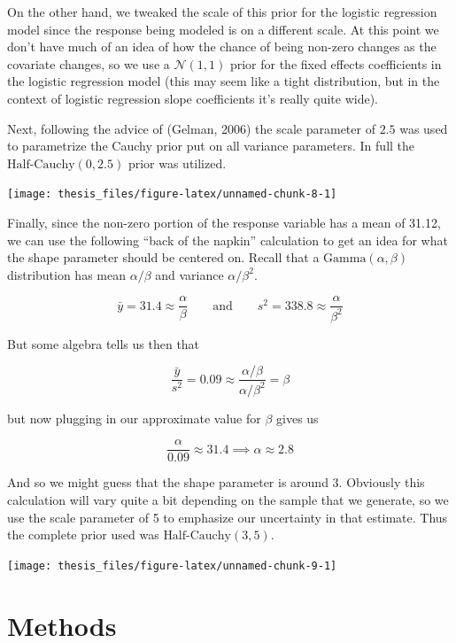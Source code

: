 \documentclass[12pt,twoside]{reedthesis}
\begin{document}
On the other hand, we tweaked the scale of this prior for the logistic regression model since the response being modeled is on a different scale. At this point we don't have much of an idea of how the chance of being non-zero changes as the covariate changes, so we use a \(\mathcal{N}(1,1)\) prior for the fixed effects coefficients in the logistic regression model (this may seem like a tight distribution, but in the context of logistic regression slope coefficients it's really quite wide).

Next, following the advice of (Gelman, 2006) the scale parameter of \(2.5\) was used to parametrize the Cauchy prior put on all variance parameters. In full the \(\text{Half-Cauchy}(0, 2.5)\) prior was utilized.
\begin{center}\texttt{[image: thesis\_files/figure-latex/unnamed-chunk-8-1]} \end{center}

Finally, since the non-zero portion of the response variable has a mean of 31.12, we can use the following ``back of the napkin'' calculation to get an idea for what the shape parameter should be centered on. Recall that a \(\text{Gamma}(\alpha, \beta)\) distribution has mean \(\alpha / \beta\) and variance \(\alpha / \beta^2\).

\[
\bar{y} = 31.4 \approx \frac{\alpha}{\beta}\qquad \text{and} \qquad s^2 = 338.8 \approx \frac{\alpha}{\beta^2}
\]

But some algebra tells us then that

\[
\frac{\bar{y}}{s^2} = 0.09 \approx \frac{\alpha / \beta}{\alpha / \beta^2} = \beta 
\]

but now plugging in our approximate value for \(\beta\) gives us

\[
\frac{\alpha}{0.09} \approx 31.4 \implies \alpha \approx 2.8
\]

And so we might guess that the shape parameter is around 3. Obviously this calculation will vary quite a bit depending on the sample that we generate, so we use the scale parameter of 5 to emphasize our uncertainty in that estimate. Thus the complete prior used was \(\text{Half-Cauchy}(3, 5)\).
\begin{center}\texttt{[image: thesis\_files/figure-latex/unnamed-chunk-9-1]} \end{center}

\hypertarget{methods}{%
\section{Methods}\label{methods}}
\end{document}
